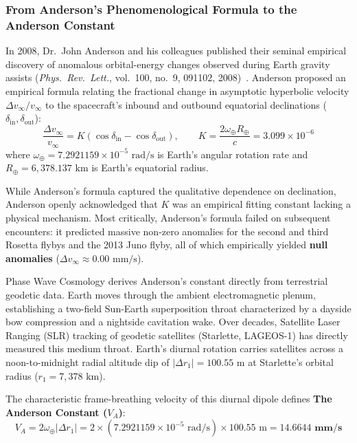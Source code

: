 \documentclass[11pt,a4paper]{article}
\begin{document}
\subsubsection{From Anderson's Phenomenological Formula to the Anderson Constant}
\label{subsubsec:anderson_constant_derivation}

In 2008, Dr.~John Anderson and his colleagues published their seminal empirical discovery of anomalous orbital-energy changes observed during Earth gravity assists (\textit{Phys.~Rev.~Lett.}, vol.~100, no.~9, 091102, 2008)~\cite{Anderson2008}. Anderson proposed an empirical formula relating the fractional change in asymptotic hyperbolic velocity $\Delta v_\infty / v_\infty$ to the spacecraft's inbound and outbound equatorial declinations ($\delta_{\text{in}}, \delta_{\text{out}}$):
\begin{equation}
\frac{\Delta v_\infty}{v_\infty} = K (\cos\delta_{\text{in}} - \cos\delta_{\text{out}}), \qquad K = \frac{2\omega_\oplus R_\oplus}{c} = 3.099 \times 10^{-6}
\label{eq:anderson_empirical_k}
\end{equation}
where $\omega_\oplus = 7.2921159 \times 10^{-5}\text{ rad/s}$ is Earth's angular rotation rate and $R_\oplus = 6,378.137\text{ km}$ is Earth's equatorial radius.

While Anderson's formula captured the qualitative dependence on declination, Anderson openly acknowledged that $K$ was an empirical fitting constant lacking a physical mechanism. Most critically, Anderson's formula failed on subsequent encounters: it predicted massive non-zero anomalies for the second and third Rosetta flybys and the 2013 Juno flyby, all of which empirically yielded \textbf{null anomalies} ($\Delta v_\infty \approx 0.00\text{ mm/s}$).

Phase Wave Cosmology derives Anderson's constant directly from terrestrial geodetic data. Earth moves through the ambient electromagnetic plenum, establishing a two-field Sun-Earth superposition throat characterized by a dayside bow compression and a nightside cavitation wake. Over decades, Satellite Laser Ranging (SLR) tracking of geodetic satellites (Starlette, LAGEOS-1) has directly measured this medium throat. Earth's diurnal rotation carries satellites across a noon-to-midnight radial altitude dip of $|\Delta r_1| = 100.55\text{ m}$ at Starlette's orbital radius ($r_1 = 7,378\text{ km}$).

The characteristic frame-breathing velocity of this diurnal dipole defines \textbf{The Anderson Constant ($V_A$)}:
\begin{equation}
V_A = 2\omega_\oplus |\Delta r_1| = 2 \times (7.2921159 \times 10^{-5}\text{ rad/s}) \times 100.55\text{ m} = \mathbf{14.6644\text{ mm/s}}
\label{eq:anderson_constant_va}
\end{equation}
\end{document}
